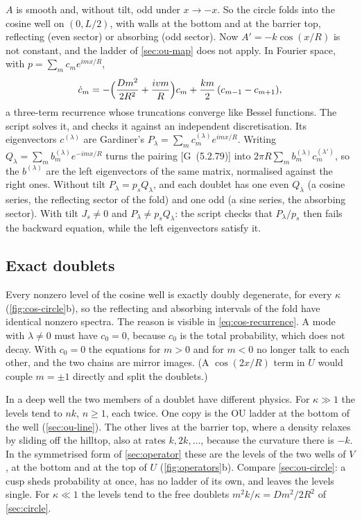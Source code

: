 \documentclass[11pt]{article}
\numberwithin{equation}{section}
\newcommand{\G}[1]{[G~(#1)]}
\begin{document}
$A$ is smooth and, without tilt, odd under $x\to-x$. So the circle folds into the cosine well on $(0,L/2)$, with
walls at the bottom and at the barrier top, reflecting (even sector) or absorbing (odd sector). Now
$A'=-k\cos(x/R)$ is not constant, and the ladder of \cref{sec:ou-map} does not apply. In Fourier space, with
$p=\sum_mc_me^{imx/R}$,
\begin{equation}
  \dot c_m=-\Bigl(\frac{Dm^2}{2R^2}+\frac{ivm}{R}\Bigr)c_m+\frac{km}2\,(c_{m-1}-c_{m+1}),
  \label{eq:cos-recurrence}
\end{equation}
a three-term recurrence whose truncations converge like Bessel functions. The script solves it, and checks it
against an independent discretisation. Its eigenvectors $c^{(\lambda)}$ are Gardiner's
$P_\lambda=\sum_mc^{(\lambda)}_me^{imx/R}$. Writing $Q_\lambda=\sum_mb^{(\lambda)}_me^{-imx/R}$ turns the pairing
\G{5.2.79} into $2\pi R\sum_mb^{(\lambda)}_mc^{(\lambda')}_m$, so the $b^{(\lambda)}$ are the left eigenvectors of
the same matrix, normalised against the right ones. Without tilt $P_\lambda=p_sQ_\lambda$, and each doublet has one
even $Q_\lambda$ (a cosine series, the reflecting sector of the fold) and one odd (a sine series, the absorbing
sector). With tilt $J_s\neq0$ and $P_\lambda\neq p_sQ_\lambda$: the script checks that $P_\lambda/p_s$ then fails the
backward equation, while the left eigenvectors satisfy it.

\subsection{Exact doublets}

Every nonzero level of the cosine well is exactly doubly degenerate, for every $\kappa$
(\cref{fig:cos-circle}b), so the reflecting and absorbing intervals of the fold have identical nonzero spectra.
The reason is visible in \cref{eq:cos-recurrence}. A mode with $\lambda\neq0$ must have $c_0=0$, because $c_0$
is the total probability, which does not decay. With $c_0=0$ the equations for $m>0$ and for $m<0$ no longer
talk to each other, and the two chains are mirror images. (A $\cos(2x/R)$ term in $U$ would couple $m=\pm1$
directly and split the doublets.)

In a deep well the two members of a doublet have different physics. For $\kappa\gg1$ the levels tend to $nk$,
$n\ge1$, each twice. One copy is the OU ladder at the bottom of the well (\cref{sec:ou-line}). The other lives at
the barrier top, where a density relaxes by sliding off the hilltop, also at rates $k,2k,\dots$, because the
curvature there is $-k$. In the symmetrised form of \cref{sec:operator} these are the levels of the two wells
of $V$, at the bottom and at the top of $U$ (\cref{fig:operators}b). Compare \cref{sec:ou-circle}: a cusp sheds probability at once, has no ladder of its
own, and leaves the levels single. For $\kappa\ll1$ the levels tend to the free doublets
$m^2k/\kappa=Dm^2/2R^2$ of \cref{sec:circle}.
\end{document}
